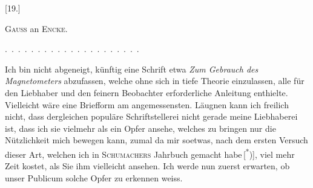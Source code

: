 \clearpage\begingroup{}
\begin{center}[19.]\end{center}
\begin{center}\textsc{Gauss} an \textsc{Encke}.\end{center}
\noindent .\ .\ .\ .\ .\ .\ .\ .\ .\ .\ .\ .\ .\ .\ .\ .\ .\ .\ .\ .\ .\par
\indent Ich bin nicht abgeneigt, künftig eine Schrift etwa \textit{Zum Gebrauch des
Magnetometers} abzufassen, welche ohne sich in tiefe Theorie einzulassen, alle
für den Liebhaber und den feinern Beobachter erforderliche Anleitung enthielte.
Vielleicht wäre eine Briefform am angemessensten. Läugnen kann
ich freilich nicht, dass dergleichen populäre Schriftstellerei nicht gerade meine
Liebhaberei ist, dass ich sie vielmehr als ein Opfer ansehe, welches zu bringen
nur die Nützlichkeit mich bewegen kann, zumal da mir soetwas, nach dem
ersten Versuch dieser Art, welchen ich in \textsc{Schumachers} Jahrbuch gemacht
\clearpage{}
\noindent habe\,[\textsuperscript{*})], viel mehr Zeit kostet, als Sie ihm vielleicht ansehen. Ich werde
nun zuerst erwarten, ob unser Publicum solche Opfer zu erkennen weiss.\begingroup\renewcommand{\thefootnote}{}
\endgroup

